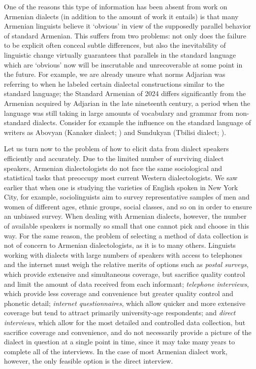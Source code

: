 \documentclass[output=paper]{langscibook}
\begin{document}
One of the reasons this type of information has been absent from work on Armenian dialects (in addition to the amount of work it entails) is that many Armenian linguists believe it `obvious' in view of the supposedly parallel behavior of standard Armenian. This suffers from two problems: not only does the failure to be explicit often conceal subtle differences, but also the inevitability of linguistic change virtually guarantees that parallels in the standard language which are `obvious' now will be inscrutable and unrecoverable at some point in the future. For example, we are already unsure what norms Adjarian was referring to when he labeled certain dialectal constructions similar to the standard language; the Standard Armenian of 2024 differs significantly from the Armenian acquired by Adjarian in the late nineteenth century, a period when the language was still taking in large amounts of vocabulary and grammar from non-standard dialects.  Consider for example the influence on the standard language of   writers as Abovyan (Kanaker dialect; ) and Sundukyan (Tbilisi dialect; \citealt{Sundukyan-1951-CompleteCollection}). 

Let us turn now to the problem of how to elicit data from dialect speakers efficiently and accurately. Due to the limited number of surviving dialect speakers, Armenian dialectologists do not face the same sociological and statistical tasks that preoccupy most current Western dialectologists. We saw earlier that when one is studying the varieties of English spoken in New York City, for example, sociolinguists aim to survey representative samples of men and women of different ages, ethnic groups, social classes, and so on in order to ensure an unbiased survey. When dealing with Armenian dialects, however, the number of available speakers is normally so small that one cannot pick and choose in this way. For the same reason, the problem of selecting a method of data collection is not of concern to Armenian dialectologists, as it is to many others. Linguists working with dialects with large numbers of speakers with access to telephones and the internet must weigh the relative merits of options such as \textit{postal surveys}, which provide extensive and simultaneous coverage, but sacrifice quality control and limit the amount of data received from each informant; \textit{telephone interviews}, which provide less coverage and convenience but greater quality control and phonetic detail; \textit{internet questionnaires}, which allow quicker and more extensive coverage but tend to attract primarily university-age respondents; and \textit{direct interviews}, which allow for the most detailed and controlled data collection, but sacrifice coverage and convenience, and do not necessarily provide a picture of the dialect in question at a single point in time, since it may take many years to complete all of the interviews. In the case of most Armenian dialect work, however, the only feasible option is the direct interview.
\end{document}
